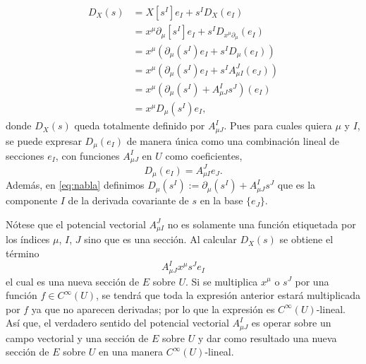 \begin{align}
\label{eq:nabla}
D_{X}(s) & = X[s^{I}] e_{I} + s^{I} D_{X} (e_{I}) \nonumber \\
& = x^{\mu} \partial_{\mu} [s^{I}] e_{I} + s^{I} D_{x^{\mu} \partial_{\mu}} (e_{I}) \nonumber \\
& = x^{\mu} (\partial_{\mu} (s^{I}) e_{I} + s^{I} D_{\mu} (e_{I})) \nonumber \\
& = x^{\mu} (\partial_{\mu} (s^{I}) e_{I} + s^{I} A^{J}_{\mu I} (e_{J})) \nonumber \\
& = x^{\mu} (\partial_{\mu} (s^{I}) + A^{I}_{\mu J} s^{J}) (e_{I}) \nonumber \\
& = x^{\mu} D_{\mu} (s^{I}) e_{I},
\end{align}
%
donde $D_{X}(s)$ queda totalmente definido por $A^{I}_{\mu J}$. Pues para cuales quiera $\mu$ y $I$, se puede expresar $D_{\mu} (e_{I})$ de manera \'{u}nica como una combinaci\'{o}n lineal de secciones $e_{I}$, con funciones $A^{I}_{\mu J}$ en $U$ como coeficientes,
%
\begin{equation}
D_{\mu} (e_{I}) = A^{J}_{\mu I} e_{J}.
\end{equation}
%
Adem\'{a}s, en \eqref{eq:nabla} definimos $D_{\mu} (s^{I}) := \partial_{\mu} (s^{I}) + A^{I}_{\mu J} s^{J}$ que es la componente $I$ de la derivada covariante de $s$ en la base $\{e_{J}\}$.

N\'{o}tese que el potencial vectorial $A^{J}_{\mu I}$ no es solamente una funci\'{o}n etiquetada por los \'{i}ndices $\mu$, $I$, $J$ sino que es una secci\'{o}n. Al calcular $D_{X} (s)$ se obtiene el t\'{e}rmino
%
\begin{equation*}
A^{I}_{\mu J} x^{\mu} s^{J} e_{I}
\end{equation*}
%
el cual es una nueva secci\'{o}n de $E$ sobre $U$. Si se multiplica $x^{\mu}$ o $s^{J}$ por una funci\'{o}n $f \in C^{\infty}(U)$, se tendr\'{a} que toda la expresi\'{o}n anterior estar\'{a} multiplicada por $f$ ya que no aparecen derivadas; por lo que la expresi\'{o}n es $C^{\infty}(U)$-lineal. As\'{i} que, el verdadero sentido del potencial vectorial $A^{I}_{\mu J}$ es operar sobre un campo vectorial y una secci\'{o}n de $E$ sobre $U$ y dar como resultado una nueva secci\'{o}n de $E$ sobre $U$ en una manera $C^{\infty}(U)$-lineal.

